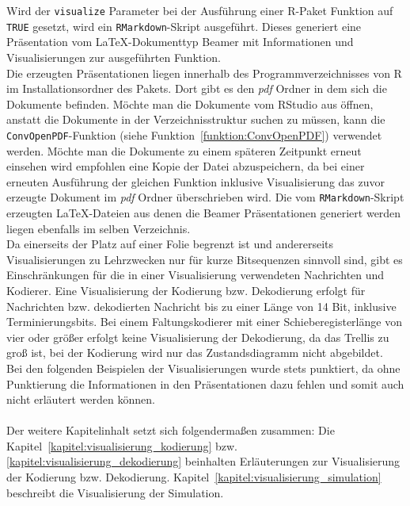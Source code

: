 Wird der \texttt{visualize} Parameter bei der Ausführung einer R-Paket Funktion auf \texttt{TRUE} gesetzt, wird ein \texttt{RMarkdown}-Skript ausgeführt. Dieses generiert eine  Präsentation vom \LaTeX -Dokumenttyp Beamer mit Informationen und Visualisierungen zur ausgeführten Funktion.
\\
Die erzeugten Präsentationen liegen innerhalb des Programmverzeichnisses von R im Installationsordner des Pakets. Dort gibt es den \emph{pdf} Ordner in dem sich die Dokumente befinden. Möchte man die Dokumente vom RStudio aus öffnen, anstatt die Dokumente in der Verzeichnisstruktur suchen zu müssen, kann die \texttt{ConvOpenPDF}-Funktion (siehe Funktion~\ref{funktion:ConvOpenPDF}) verwendet werden. Möchte man die Dokumente zu einem späteren Zeitpunkt erneut einsehen wird empfohlen eine Kopie der Datei abzuspeichern, da bei einer erneuten Ausführung der gleichen Funktion inklusive Visualisierung das zuvor erzeugte Dokument im \emph{pdf} Ordner überschrieben wird. Die vom \texttt{RMarkdown}-Skript erzeugten \LaTeX -Dateien aus denen die Beamer Präsentationen generiert werden liegen ebenfalls im selben Verzeichnis.
\\
Da einerseits der Platz auf einer Folie begrenzt ist und andererseits Visualisierungen zu Lehrzwecken nur für kurze Bitsequenzen sinnvoll sind, gibt es Einschränkungen für die in einer Visualisierung verwendeten Nachrichten und Kodierer. Eine Visualisierung der Kodierung bzw. Dekodierung erfolgt für Nachrichten bzw. dekodierten Nachricht bis zu einer Länge von 14 Bit, inklusive Terminierungsbits. Bei einem Faltungskodierer mit einer Schieberegisterlänge von vier oder größer erfolgt keine Visualisierung der Dekodierung, da das Trellis zu groß ist, bei der Kodierung wird nur das Zustandsdiagramm nicht abgebildet.
\\
Bei den folgenden Beispielen der Visualisierungen wurde stets punktiert, da ohne Punktierung die Informationen in den Präsentationen dazu fehlen und somit auch nicht erläutert werden können.
\\
\\
Der weitere Kapitelinhalt setzt sich folgendermaßen zusammen: Die Kapitel~\ref{kapitel:visualisierung_kodierung} bzw. \ref{kapitel:visualisierung_dekodierung} beinhalten Erläuterungen zur Visualisierung der Kodierung bzw. Dekodierung. Kapitel~\ref{kapitel:visualisierung_simulation} beschreibt die Visualisierung der Simulation.
